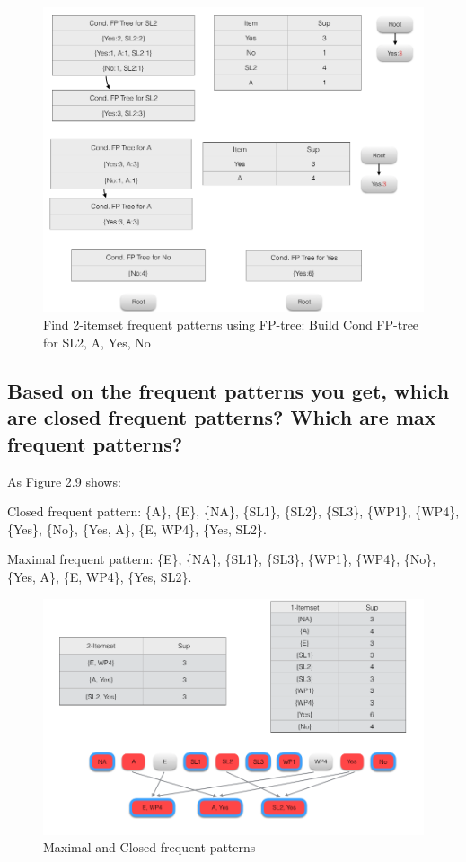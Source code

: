 \documentclass[paper=a4, fontsize=11pt]{scrartcl} %
\numberwithin{equation}{section} %
\numberwithin{figure}{section} %
\numberwithin{table}{section} %
\begin{document}
\begin{figure}[h]
    \centering
    \includegraphics[scale=0.5]{image8.png}
    \caption{Find 2-itemset frequent patterns using FP-tree: Build Cond FP-tree for SL2, A, Yes, No}
\end{figure}

\subsection{Based on the frequent patterns you get, which are closed frequent patterns? Which are max frequent patterns?}

As Figure 2.9 shows:

Closed frequent pattern: \{A\}, \{E\}, \{NA\}, \{SL1\}, \{SL2\}, \{SL3\}, \{WP1\}, \{WP4\}, \{Yes\}, \{No\}, \{Yes, A\}, \{E, WP4\}, \{Yes, SL2\}.

Maximal frequent pattern: \{E\}, \{NA\}, \{SL1\}, \{SL3\}, \{WP1\}, \{WP4\}, \{No\}, \{Yes, A\}, \{E, WP4\}, \{Yes, SL2\}.

\begin{figure}[h]
    \centering
    \includegraphics[scale=0.5]{image9.png}
    \caption{Maximal and Closed frequent patterns}
\end{figure}

\end{document}
